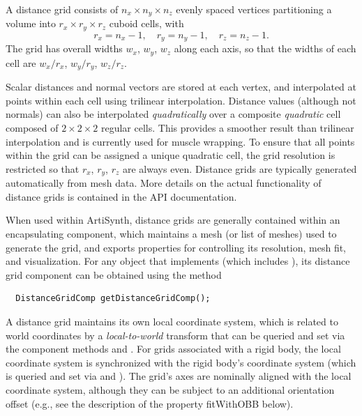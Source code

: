 A distance grid consists of $n_x \times n_y \times n_z$ evenly spaced
vertices partitioning a volume into $r_x \times r_y \times r_z$ cuboid
cells, with
%
\begin{equation*}
r_x = n_x-1, \quad r_y = n_y-1, \quad r_z = n_z-1.
\end{equation*}
%
The grid has overall widths $w_x$, $w_y$, $w_z$ along each axis, so
that the widths of each cell are $w_x/r_x$, $w_y/r_y$, $w_z/r_z$. 

Scalar distances and normal vectors are stored at each vertex, and
interpolated at points within each cell using trilinear interpolation.
Distance values (although not normals) can also be interpolated {\it
quadratically} over a composite {\it quadratic} cell composed of $2
\times 2 \times 2$ regular cells. This provides a smoother result than
trilinear interpolation and is currently used for muscle wrapping. To
ensure that all points within the grid can be assigned a unique
quadratic cell, the grid resolution is restricted so that $r_x$,
$r_y$, $r_z$ are always even. Distance grids are typically generated
automatically from mesh data.  More details on the actual
functionality of distance grids is contained in 
the  API documentation.

When used within ArtiSynth, distance grids are generally contained
within an encapsulating  component,
which maintains a mesh (or list of meshes) used to generate the grid,
and exports properties for controlling its resolution, mesh fit, and
visualization. For any object that implements
 (which includes
), its distance grid component can be
obtained using the method
%
\begin{lstlisting}
  DistanceGridComp getDistanceGridComp();
\end{lstlisting}
%

A distance grid maintains its own local coordinate system, which is
related to world coordinates by a {\it local-to-world} transform that
can be queried and set via the component methods
 and
.
For grids associated with a rigid body, the local coordinate system is
synchronized with the rigid body's coordinate system (which
is queried and set via
 and
).
The grid's axes are nominally aligned with the local coordinate
system, although they can be subject to an additional orientation
offset (e.g., see the description of the property {\sf fitWithOBB}
below).

